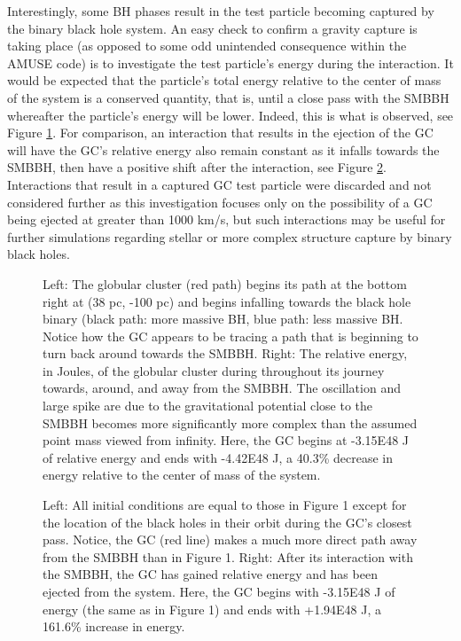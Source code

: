 \documentclass{aastex62}
\begin{document}
Interestingly, some BH phases result in the test particle becoming captured by the binary black hole system. An easy check to confirm a gravity capture is taking place (as opposed to some odd unintended consequence within the AMUSE code) is to investigate the test particle's energy during the interaction. It would be expected that the particle's total energy relative to the center of mass of the system is a conserved quantity, that is, until a close pass with the SMBBH whereafter the particle's energy will be lower. Indeed, this is what is observed, see Figure \ref{fig3}. For comparison, an interaction that results in the ejection of the GC will have the GC's relative energy also remain constant as it infalls towards the SMBBH, then have a positive shift after the interaction, see Figure \ref{fig4}. Interactions that result in a captured GC test particle were discarded and not considered further as this investigation focuses only on the possibility of a GC being ejected at greater than 1000 km/s, but such interactions may be useful for further simulations regarding stellar or more complex structure capture by binary black holes.
\begin{figure}
\caption{Left: The globular cluster (red path) begins its path at the bottom right at (38 pc, -100 pc) and begins infalling towards the black hole binary (black path: more massive BH, blue path: less massive BH. Notice how the GC appears to be tracing a path that is beginning to turn back around towards the SMBBH. Right: The relative energy, in Joules, of the globular cluster during throughout its journey towards, around, and away from the SMBBH. The oscillation and large spike are due to the gravitational potential close to the SMBBH becomes more significantly more complex than the assumed point mass viewed from infinity. Here, the GC begins at -3.15E48 J of relative energy and ends with -4.42E48 J, a 40.3\% decrease in energy relative to the center of mass of the system.\label{fig3}}
\end{figure}
\begin{figure}
\caption{Left: All initial conditions are equal to those in Figure 1 except for the location of the black holes in their orbit during the GC's closest pass. Notice, the GC (red line) makes a much more direct path away from the SMBBH than in Figure 1. Right: After its interaction with the SMBBH, the GC has gained relative energy and has been ejected from the system. Here, the GC begins with -3.15E48 J of energy (the same as in Figure 1) and ends with +1.94E48 J, a 161.6\% increase in energy.\label{fig4}}
\end{figure}
\end{document}
